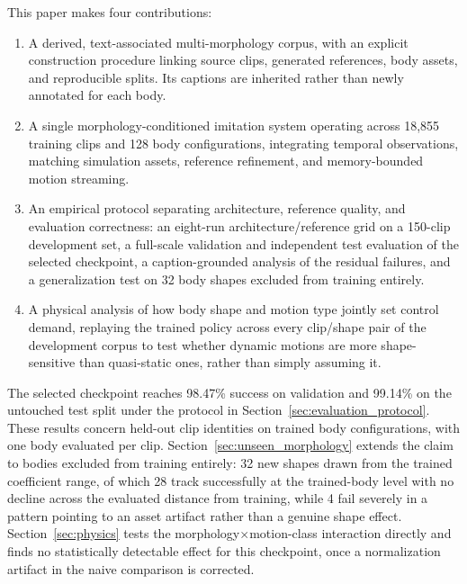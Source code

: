 This paper makes four contributions:
\begin{enumerate}
    \item A derived, text-associated multi-morphology corpus, with an explicit
    construction procedure linking source clips, generated references, body
    assets, and reproducible splits. Its captions are inherited rather than
    newly annotated for each body.
    \item A single morphology-conditioned imitation system operating across
    18,855 training clips and 128 body configurations, integrating temporal
    observations, matching simulation assets, reference refinement, and
    memory-bounded motion streaming.
    \item An empirical protocol separating architecture, reference quality,
    and evaluation correctness: an eight-run architecture/reference grid on a
    150-clip development set, a full-scale validation and independent test
    evaluation of the selected checkpoint, a caption-grounded analysis of the
    residual failures, and a generalization test on 32 body shapes excluded
    from training entirely.
    \item A physical analysis of how body shape and motion type jointly set
    control demand, replaying the trained policy across every clip/shape pair
    of the development corpus to test whether dynamic motions are more
    shape-sensitive than quasi-static ones, rather than simply assuming it.
\end{enumerate}

The selected checkpoint reaches 98.47\% success on validation and 99.14\% on
the untouched test split under the protocol in
Section~\ref{sec:evaluation_protocol}. These results concern held-out clip
identities on trained body configurations, with one body evaluated per clip.
Section~\ref{sec:unseen_morphology} extends the claim to bodies excluded
from training entirely: 32 new shapes drawn from the trained coefficient
range, of which 28 track successfully at the trained-body level with no
decline across the evaluated distance from training, while 4 fail severely
in a pattern pointing to an asset artifact rather than a genuine shape
effect. Section~\ref{sec:physics} tests the morphology$\times$motion-class
interaction directly and finds no statistically detectable effect for this
checkpoint, once a normalization artifact in the naive comparison is
corrected.
